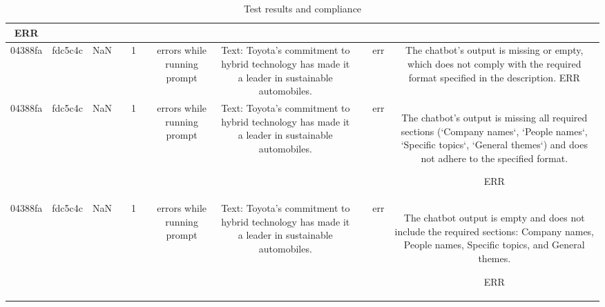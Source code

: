 \begin{table}[h!]
\begin{tabular}{|c|c|c|c|c|c|c|c|c|c|c|}
ERR\\
\hline
04388fa & fdc5c4c & NaN &  & 1 &  & errors while running prompt & Text: Toyota’s commitment to hybrid technology has made it a leader in sustainable automobiles. &  & err & The chatbot's output is missing or empty, which does not comply with the required format specified in the description.
ERR\\
\hline
04388fa & fdc5c4c & NaN &  & 1 &  & errors while running prompt & Text: Toyota’s commitment to hybrid technology has made it a leader in sustainable automobiles. &  & err & The chatbot's output is missing all required sections (`Company names`, `People names`, `Specific topics`, `General themes`) and does not adhere to the specified format.

ERR\\
\hline
04388fa & fdc5c4c & NaN &  & 1 &  & errors while running prompt & Text: Toyota’s commitment to hybrid technology has made it a leader in sustainable automobiles. &  & err & The chatbot output is empty and does not include the required sections: Company names, People names, Specific topics, and General themes.

ERR
  \end{tabular}
  \caption{Test results and compliance}
  
  \end{table}
  